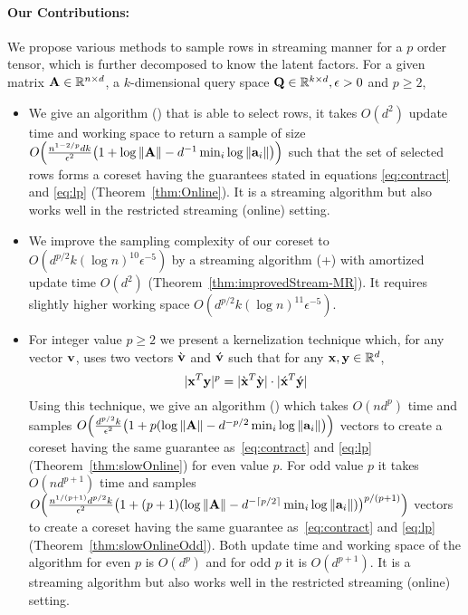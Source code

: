 \paragraph{Our Contributions:}
We propose various methods to sample rows in streaming manner for a $p$ order tensor, which is further decomposed to know the latent factors. For a given matrix $\mathbf{A} \in \mathbb{R}^{n\times d}$, a $k$-dimensional query space $\mathbf{Q} \in \mathbb{R}^{k \times d},\epsilon>0$ and $p\geq 2$,
\begin{itemize}
    \item We give an algorithm (\online) that is able to select rows, it takes $O(d^2)$ update time and working space to return a sample of size $O\Big(\frac{n^{1-2/p} dk}{\epsilon^{2}} \big(1+\log\|\mathbf{A}\| - d^{-1}\min_{i}\log\|\mathbf{a}_{i}\|\big)\Big)$ such that the set of selected rows forms a coreset having the guarantees stated in equations \eqref{eq:contract} and \eqref{eq:lp} (Theorem~\ref{thm:Online}). It is a streaming algorithm but also works well in the restricted streaming (online) setting.
    \item We improve the sampling complexity of our coreset to $O(d^{p/2}k(\log n)^{10}\epsilon^{-5})$ by a streaming algorithm (\online+\mrlw) with amortized update time $O(d^2)$ (Theorem~\ref{thm:improvedStream-MR}). It requires slightly higher working space $O(d^{p/2}k(\log n)^{11}\epsilon^{-5})$.
    \item For integer value $p \geq 2$ we present a kernelization technique which, for any vector $\mathbf{v}$, uses two vectors $\grave{\mathbf{v}}$ and $\acute{\mathbf{v}}$ such that for any $\mathbf{x}, \mathbf{y} \in \mathbb{R}^{d}$,
    \begin{equation*}
        |\mathbf{x}^T \mathbf{y}|^p = |\grave{\mathbf{x}}^T \grave{\mathbf{y}}|\cdot|\acute{\mathbf{x}}^T \acute{\mathbf{y}}|
    \end{equation*}
    Using this technique, we give an algorithm () which takes $O(nd^{p})$ time and samples $O\Big(\frac{d^{p/2}k}{\epsilon^{2}} \big(1+p(\log\|\mathbf{A}\| - d^{-p/2}\min_{i}\log\|\mathbf{a}_{i}\|\big)\Big)$ vectors to create a coreset having the same guarantee as~\eqref{eq:contract} and \eqref{eq:lp} (Theorem~\ref{thm:slowOnline}) for even value $p$. For odd value $p$ it takes $O(nd^{p+1})$ time and samples $O\Big(\frac{n^{1/(p+1)}d^{p/2}k}{\epsilon^{2}}\big(1+(p+1)(\log\|\mathbf{A}\| - d^{-\lceil p/2 \rceil}\min_{i}\log\|\mathbf{a}_{i}\|)\big)^{p/(p+1)}\Big)$ vectors to create a coreset having the same guarantee as~\eqref{eq:contract} and \eqref{eq:lp} (Theorem~\ref{thm:slowOnlineOdd}).
    Both update time and working space of the algorithm for even $p$ is $O(d^{p})$ and for odd $p$ it is $O(d^{p+1})$. It is a streaming algorithm but also works well in the restricted streaming (online) setting.

\end{itemize}

